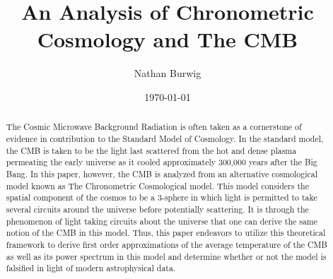 \documentclass[a4paper]{article}
\title {\textbf{An Analysis of Chronometric Cosmology and The CMB}}
\author{Nathan Burwig}
\date  {\today}
\begin{document}
    \maketitle

    \begin{abstract}
        The Cosmic Microwave Background Radiation is often taken as a
        cornerstone of evidence in contribution to the Standard Model of
        Cosmology. In the standard model, the CMB is taken to be the light last
        scattered from the hot and dense plasma permeating the early universe
        as it cooled approximately 300,000 years after the Big Bang. In this
        paper, however, the CMB is analyzed from an alternative cosmological
        model known as The Chronometric Cosmological model. This model
        considers the spatial component of the cosmos to be a 3-sphere in which
        light is permitted to take several circuits around the universe before
        potentially scattering. It is through the phenomenon of light taking
        circuits about the universe that one can derive the same notion of the
        CMB in this model. Thus, this paper endeavors to utilize this
        theoretical framework to derive first order approximations of the
        average temperature of the CMB as well as its power spectrum in this
        model and determine whether or not the model is falsified in light of
        modern astrophysical data.
    \end{abstract}

    \newpage
    \tableofcontents
    \newpage
\end{document}
